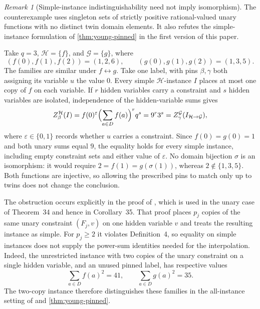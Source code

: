 \documentclass[11pt,letterpaper,onecolumn]{article}
\theoremstyle{plain}
\theoremstyle{definition}
\theoremstyle{remark}
\newtheorem{remark}[remark]{Remark}
\begin{document}
\begin{remark}[Simple-instance indistinguishability need not imply isomorphism]
\label{rem:simple-instance-counterexample}
The counterexample uses singleton sets of strictly positive
rational-valued unary functions with no distinct twin domain elements.
It also refutes the simple-instance formulation of
\cref{thm:young-pinned} in the first version of this paper.

Take $q=3$, $\mathcal H=\{f\}$, and $\mathcal G=\{g\}$, where
\[
  (f(0),f(1),f(2))=(1,2,6),\qquad
  (g(0),g(1),g(2))=(1,3,5).
\]
The families are similar under $f\leftrightarrow g$.  Take one label, with
pins $\beta,\gamma$ both assigning its variable $u$ the value $0$.  Every simple
$\mathcal H$-instance $I$ places at most one copy of $f$ on each variable.
If $r$ hidden variables carry a constraint and $s$ hidden variables are
isolated, independence of the hidden-variable sums gives
\[
  Z_{\beta}^{\mathcal H}(I)
  =f(0)^{\varepsilon}\Bigl(\sum_{a\in D}f(a)\Bigr)^r q^s
  =9^r3^s
  =Z_{\gamma}^{\mathcal G}(I_{\mathcal H\to\mathcal G}),
\]
where $\varepsilon\in\{0,1\}$ records whether $u$ carries a constraint.
Since $f(0)=g(0)=1$ and both unary sums equal $9$, the equality holds for
every simple instance, including empty constraint sets and either value
of $\varepsilon$.  No domain bijection $\sigma$ is an
isomorphism: it would require $2=f(1)=g(\sigma(1))$, whereas
$2\notin\{1,3,5\}$.  Both functions are injective, so allowing the prescribed
pins to match only up to twins does not change the conclusion.

The obstruction occurs explicitly in the proof of
\cite[Lemma~29, p.~20]{Young2025}, which is used in the unary case of
Theorem~34 and hence in Corollary~35.  That proof places $p_j$ copies of
the same unary constraint $(F_j,v)$ on one hidden variable $v$ and treats
the resulting instance as simple.  For $p_j\ge2$ it violates Definition~4,
so equality on simple instances does not supply the power-sum identities
needed for the interpolation.  Indeed, the unrestricted instance with two
copies of the unary constraint on a single hidden variable, and an unused
pinned label, has respective values
\[
  \sum_{a\in D}f(a)^2=41,\qquad
  \sum_{a\in D}g(a)^2=35.
\]
The two-copy instance therefore distinguishes these families in the
all-instance setting of \cite[Theorem~8]{Young2025} and
\cref{thm:young-pinned}.
\end{remark}




\end{document}
